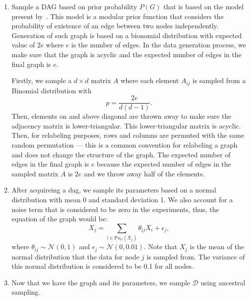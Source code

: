 \documentclass{lxaiproposal}
\begin{document}
    \begin{enumerate}
        \item Sample a DAG based on prior probability $P(G)$ that is based on the model present by~\cite{erdos1960evolutionrandomgraphs}.
        This model is a modular prior function that considers the probability of existence of an edge between two
        nodes independently. Generation of such graph is based on a bionomial distribution with expected value of $2e$
        where $e$ is the number of edges. In the data generation process, we make sure that the graph is acyclic and
        the expected number of edges in the final graph is $e$.

        Firstly, we sample a $d \times d$ matrix $A$ where each element $A_{ij}$ is sampled from a Binomial
        distribution with
        \begin{equation}
            p = \frac{2e}{d(d-1)}.
            \label{eq:binomial}
        \end{equation}
        Then, elements on and above diagonal are thrown away to make sure the adjacency matrix is lower-triangular.
        This lower-triangular matrix is acyclic. Then, for relabeling purposes, rows and columns are permuted with
        the same random permutation --- this is a common convention for relabeling a graph and does not change the
        structure of the graph.
        The expected number of edges in the final graph is $e$ because the expected number of edges in the sampled
        matrix $A$ is $2e$ and we throw away half of the elements.

        \item After acquireing a dag, we sample its parameters
        based on a normal distribution with mean 0 and standard deviation 1. We also account for a noise term that
        is considered to be zero in the experiments, thus, the equation of the graph would be:
        \begin{equation}
            X_j = \sum_{i \in \text{Pa}_G(X_j)} \theta_{ij}X_i + \epsilon_j,
            \label{eq:graph}
        \end{equation}
        where $\theta_{ij} \sim \mathcal{N}(0, 1)$ and $\epsilon_j \sim \mathcal{N}(0, 0.01)$. Note that $X_j$ is the
        mean of the normal distribution that the data for node $j$ is sampled from. The variance of this normal
        distribution is considered to be 0.1 for all nodes.

        \item Now that we have the graph and its parameters, we sample $\mathcal{D}$ using ancestral sampling.
    \end{enumerate}
\end{document}
